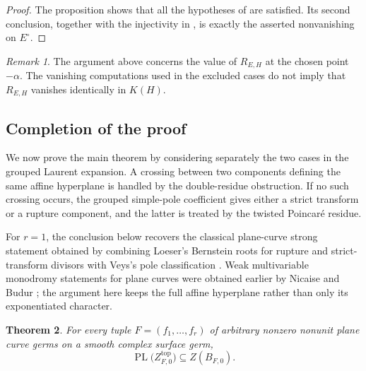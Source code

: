 \documentclass[12pt]{amsart}
\numberwithin{equation}{section}
\theoremstyle{plain}
\newtheorem{theorem}{Theorem}[section]
\theoremstyle{definition}
\theoremstyle{remark}
\newtheorem{remark}[theorem]{Remark}
\theoremstyle{definition}
\DeclareMathOperator{\PL}{PL}
\begin{document}
\begin{proof}
The proposition shows that all the hypotheses of  are satisfied. Its second conclusion, together with the injectivity in , is exactly the asserted nonvanishing on $E^\circ$.
\end{proof}

\begin{remark}
The argument above concerns the value of $R_{E,H}$ at the chosen point $-\alpha$. The vanishing computations used in the excluded cases do not imply that $R_{E,H}$ vanishes identically in $K(H)$.
\end{remark}

\subsection{Completion of the proof}

We now prove the main theorem by considering separately the two cases in the grouped Laurent expansion. A crossing between two components defining the same affine hyperplane is handled by the double-residue obstruction. If no such crossing occurs, the grouped simple-pole coefficient gives either a strict transform or a rupture component, and the latter is treated by the twisted Poincar\'e residue. 

For $r=1$, the conclusion below recovers the classical plane-curve strong statement obtained by combining Loeser's Bernstein roots for rupture and strict-transform divisors with Veys's pole classification \cite{Loeser1988,Veys1995}. Weak multivariable monodromy statements for plane curves were obtained earlier by Nicaise and Budur \cite{Nicaise2004,Budur2015}; the argument here keeps the full affine hyperplane rather than only its exponentiated character.

\begin{theorem}\label{thm:main-thm-top}
For every tuple $F=(f_1,\ldots,f_r)$ of arbitrary nonzero nonunit plane curve germs on a smooth complex surface germ,
\begin{equation*}
\PL\bigl(Z^{\mathrm{top}}_{F,0}\bigr) \subseteq Z(B_{F,0}).
\end{equation*}
\end{theorem}
\end{document}

